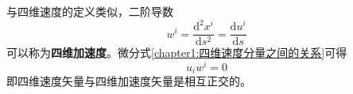 与四维速度的定义类似，二阶导数
\begin{equation*}
	w^i = \frac{\mathrm{d}^2 x^i}{\mathrm{d} s^2} = \frac{\mathrm{d} u^i}{\mathrm{d} s}
\end{equation*}
可以称为{\bf 四维加速度}。微分式\eqref{chapter1:四维速度分量之间的关系}可得
\begin{equation}
	u_i w^i = 0
\end{equation}
即四维速度矢量与四维加速度矢量是相互正交的。



